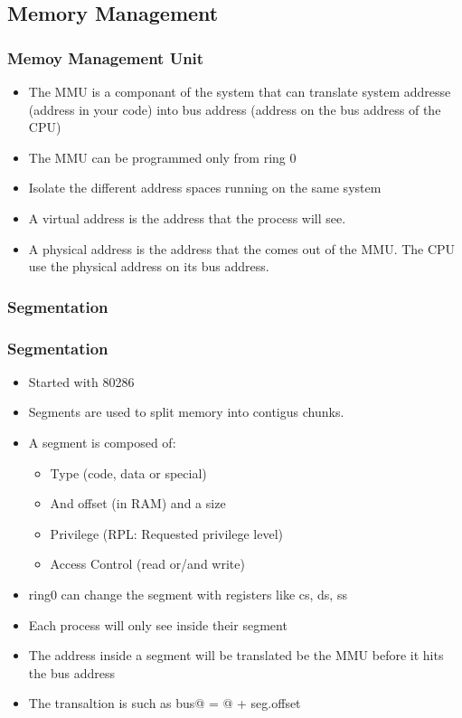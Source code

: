\subsection{Memory Management}
        \begin{frame}
        \frametitle{Memoy Management Unit}
        \begin{itemize}
                \item The MMU is a componant of the system that can
                translate system addresse (address in your code) into
                bus address (address on the bus address of the CPU)
                \item The MMU can be programmed only from ring 0
                \item Isolate the different address spaces running on
                the same system
                \item A virtual address is the address that the process will see.
                \item A physical address is the address that the comes
                out of the MMU. The CPU use the physical address on its
                bus address.

        \end{itemize}
        \end{frame}
\subsubsection{Segmentation}
        \begin{frame}
        \frametitle{Segmentation}
        \begin{itemize}
                \item Started with 80286
                \item Segments are used to split memory into contigus
                chunks.
                \item A segment is composed of:
                        \begin{itemize}
                        \item Type (code, data or special)
                        \item And offset (in RAM) and a size
                        \item Privilege (RPL: Requested privilege level)
                        \item Access Control (read or/and write)
                        \end{itemize}
                \item ring0 can change the segment with registers like
                cs, ds, ss
                \item Each process will only see inside their segment
                \item The address inside a segment will be translated be
                the MMU before it hits the bus address
                \item The transaltion is such as bus@ = @ + seg.offset
        \end{itemize}
        \end{frame}
